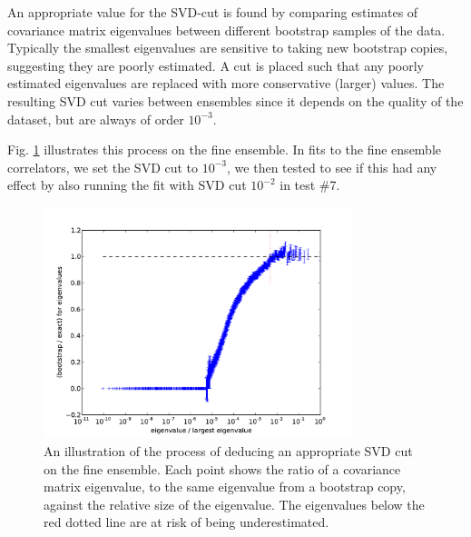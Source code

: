 An appropriate value for the SVD-cut is found by comparing estimates of covariance matrix eigenvalues between different bootstrap samples of the data. Typically the smallest eigenvalues are sensitive to taking new bootstrap copies, suggesting they are poorly estimated. A cut is placed such that any poorly estimated eigenvalues are replaced with more conservative (larger) values. The resulting SVD cut varies between ensembles since it depends on the quality of the dataset, but are always of order $10^{-3}$.

Fig. \ref{fig:svddiagnosis_BsDsstar} illustrates this process on the fine ensemble. In fits to the fine ensemble correlators, we set the SVD cut to $10^{-3}$, we then tested to see if this had any effect by also running the fit with SVD cut $10^{-2}$ in test \#7.

\begin{figure}[htb!]
  \begin{center}
  \includegraphics[width=0.8\textwidth]{images/BsDsstar/svddiagnosis_fine.pdf}
  \caption{An illustration of the process of deducing an appropriate SVD cut on the fine ensemble. Each point shows the ratio of a covariance matrix eigenvalue, to the same eigenvalue from a bootstrap copy, against the relative size of the eigenvalue. The eigenvalues below the red dotted line are at risk of being underestimated. \label{fig:svddiagnosis_BsDsstar}}
  \end{center}
  \vspace{-10pt}
\end{figure}

